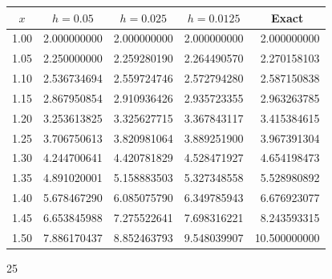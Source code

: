 \documentclass[dvips]{book}
\renewcommand{\exer}[1]{\par\medskip\;\noindent{\color{red}\bf #1.}}
\numberwithin{example}{section}
\numberwithin{equation}{section}
\numberwithin{theorem}{section}
\numberwithin{table}{section}
\numberwithin{figure}{section}
\begin{document}
\exer{3.1.8}
{\small
\begin{tabular}{|c|r|r|r|r|}\hline
\multicolumn{1}{|c|}{$x$}&
\multicolumn{1}{|c|}{$h=0.05$}&
\multicolumn{1}{|c|}{$h=0.025$}&
\multicolumn{1}{|c|}{$h=0.0125$}&
\multicolumn{1}{|c|}{Exact}\\ \hline
1.00 &  2.000000000 & 2.000000000 & 2.000000000 &  2.000000000 \\
1.05 &  2.250000000 & 2.259280190 & 2.264490570 &  2.270158103 \\
1.10 &  2.536734694 & 2.559724746 & 2.572794280 &  2.587150838 \\
1.15 &  2.867950854 & 2.910936426 & 2.935723355 &  2.963263785 \\
1.20 &  3.253613825 & 3.325627715 & 3.367843117 &  3.415384615 \\
1.25 &  3.706750613 & 3.820981064 & 3.889251900 &  3.967391304 \\
1.30 &  4.244700641 & 4.420781829 & 4.528471927 &  4.654198473 \\
1.35 &  4.891020001 & 5.158883503 & 5.327348558 &  5.528980892 \\
1.40 &  5.678467290 & 6.085075790 & 6.349785943 &  6.676923077 \\
1.45 &  6.653845988 & 7.275522641 & 7.698316221 &  8.243593315 \\
1.50 &  7.886170437 & 8.852463793 & 9.548039907 & 10.500000000 \\
\hline
\end{tabular}}


\medskip
\vspace*{0pt}
\centerline{25}
\newpage
\end{document}
